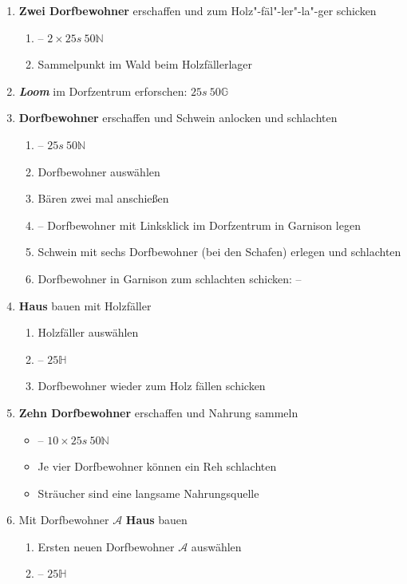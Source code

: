 \documentclass[10pt,twocolumn,a4paper]{article}
\begin{document}
\begin{enumerate}
\item \textbf{Zwei Dorfbewohner} erschaffen und zum Holz"-fäl"-ler"-la"-ger schicken\begin{enumerate}\item {} -- \hfill$2\times 25s~50\mathbb{N}$\item Sammelpunkt im Wald beim Holzfällerlager\end{enumerate}
\item \textbf{\emph{Loom}} im Dorfzentrum erforschen: \hfill$25s~50\mathbb G$
\item \textbf{Dorfbewohner} erschaffen und Schwein anlocken und schlachten\begin{enumerate}\item {} -- \hfill$25s~50\mathbb N$ \item Dorfbewohner auswählen \item Bären zwei mal anschießen \item {} -- Dorfbewohner mit Linksklick im Dorfzentrum in Garnison legen \item Schwein mit sechs Dorfbewohner (bei den Schafen) erlegen und schlachten \item Dorfbewohner in Garnison zum schlachten schicken:  --  \end{enumerate}
\item \textbf{Haus} bauen mit Holzfäller\begin{enumerate}\item Holzfäller auswählen \item{} -- \hfill$25\mathbb H$\item Dorfbewohner wieder zum Holz fällen schicken\end{enumerate}
\item \textbf{Zehn Dorfbewohner} erschaffen und Nahrung sammeln \begin{itemize}\item {} -- \hfill$10\times 25s~50\mathbb N$\item Je vier Dorfbewohner können ein Reh schlachten \item Sträucher sind eine langsame Nahrungsquelle\end{itemize} 
\item Mit Dorfbewohner $\mathcal A$ \textbf{Haus} bauen\begin{enumerate}\item Ersten neuen Dorfbewohner $\mathcal A$ auswählen \item {} -- \hfill$25\mathbb{H}$\end{enumerate}

\end{enumerate}
\end{document}

